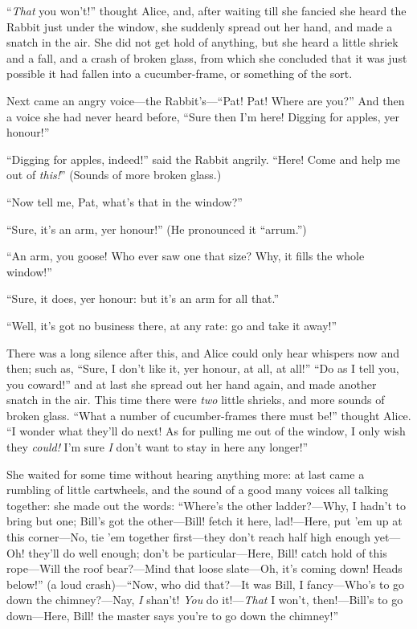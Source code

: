 \documentclass[11pt,openany,oneside]{book}
\begin{document}
“{\em That\/} you won’t!” thought Alice, and, after waiting till she fancied she heard the Rabbit just under the window, she suddenly spread out her hand, and made a snatch in the air. She did not get hold of anything, but she heard a little shriek and a fall, and a crash of broken glass, from which she concluded that it was just possible it had fallen into a cucumber-frame, or something of the sort. 

Next came an angry voice—the Rabbit’s—“Pat! Pat! Where are you?” And then a voice she had never heard before, “Sure then I’m here! Digging for apples, yer honour!” 

“Digging for apples, indeed!” said the Rabbit angrily. “Here! Come and help me out of {\em this!\/}” (Sounds of more broken glass.) 

“Now tell me, Pat, what’s that in the window?” 

“Sure, it’s an arm, yer honour!” (He pronounced it “arrum.”) 

“An arm, you goose! Who ever saw one that size? Why, it fills the whole window!” 

“Sure, it does, yer honour: but it’s an arm for all that.” 

“Well, it’s got no business there, at any rate: go and take it away!” 

There was a long silence after this, and Alice could only hear whispers now and then; such as, “Sure, I don’t like it, yer honour, at all, at all!” “Do as I tell you, you coward!” and at last she spread out her hand again, and made another snatch in the air. This time there were {\em two\/} little shrieks, and more sounds of broken glass. “What a number of cucumber-frames there must be!” thought Alice. “I wonder what they’ll do next! As for pulling me out of the window, I only wish they {\em could!\/} I’m sure {\em I\/} don’t want to stay in here any longer!” 

She waited for some time without hearing anything more: at last came a rumbling of little cartwheels, and the sound of a good many voices all talking together: she made out the words: “Where’s the other ladder?—Why, I hadn’t to bring but one; Bill’s got the other—Bill! fetch it here, lad!—Here, put ’em up at this corner—No, tie ’em together first—they don’t reach half high enough yet—Oh! they’ll do well enough; don’t be particular—Here, Bill! catch hold of this rope—Will the roof bear?—Mind that loose slate—Oh, it’s coming down! Heads below!” (a loud crash)—“Now, who did that?—It was Bill, I fancy—Who’s to go down the chimney?—Nay, {\em I\/} shan’t! {\em You\/} do it!—{\em That\/} I won’t, then!—Bill’s to go down—Here, Bill! the master says you’re to go down the chimney!” 
\end{document}
